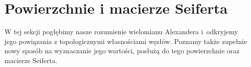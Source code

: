 %

\section{Powierzchnie i macierze Seiferta}
W tej sekcji pogłębimy nasze rozumienie wielomianu Alexandera i~odkryjemy jego powiązania z topologicznymi własnościami węzłów.
Poznamy także zupełnie nowy sposób na wyznaczanie jego wartości, posłużą do tego powierzchnie oraz macierze Seiferta.











%